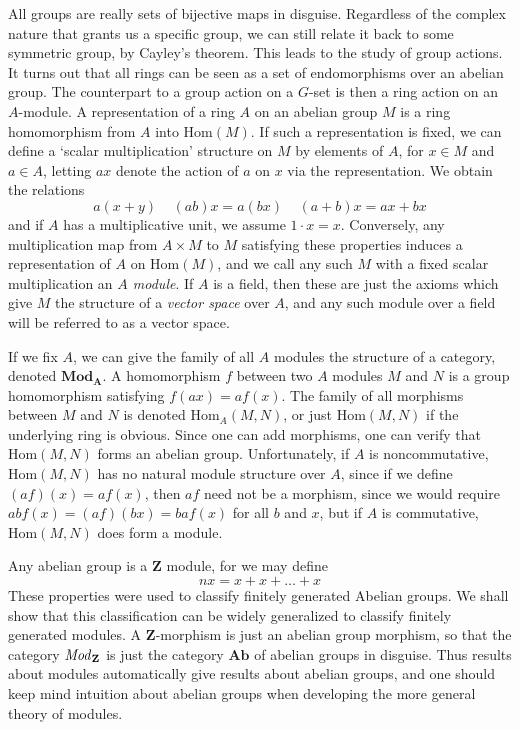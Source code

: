All groups are really sets of bijective maps in disguise. Regardless of the complex nature that grants us a specific group, we can still relate it back to some symmetric group, by Cayley's theorem. This leads to the study of group actions. It turns out that all rings can be seen as a set of endomorphisms over an abelian group. The counterpart to a group action on a $G$-set is then a ring action on an $A$-module. A representation of a ring $A$ on an abelian group $M$ is a ring homomorphism from $A$ into $\text{Hom}(M)$. If such a representation is fixed, we can define a `scalar multiplication' structure on $M$ by elements of $A$, for $x \in M$ and $a \in A$, letting $ax$ denote the action of $a$ on $x$ via the representation. We obtain the relations
%
\[ a(x + y)\ \ \ \ \ (ab) x = a(bx)\ \ \ \ \ (a + b)x = ax + bx \]
%
and if $A$ has a multiplicative unit, we assume $1 \cdot x = x$. Conversely, any multiplication map from $A \times M$ to $M$ satisfying these properties induces a representation of $A$ on $\text{Hom}(M)$, and we call any such $M$ with a fixed scalar multiplication an \emph{$A$ module}. If $A$ is a field, then these are just the axioms which give $M$ the structure of a \emph{vector space} over $A$, and any such module over a field will be referred to as a vector space.

If we fix $A$, we can give the family of all $A$ modules the structure of a category, denoted $\textbf{Mod}_{\textbf{A}}$. A homomorphism $f$ between two $A$ modules $M$ and $N$ is a group homomorphism satisfying $f(ax) = af(x)$. The family of all morphisms between $M$ and $N$ is denoted $\text{Hom}_A(M,N)$, or just $\text{Hom}(M,N)$ if the underlying ring is obvious. Since one can add morphisms, one can verify that $\text{Hom}(M,N)$ forms an abelian group. Unfortunately, if $A$ is noncommutative, $\text{Hom}(M,N)$ has no natural module structure over $A$, since if we define $(af)(x) = af(x)$, then $af$ need not be a morphism, since we would require $ab f(x) = (af)(bx) = ba f(x)$ for all $b$ and $x$, but if $A$ is commutative, $\text{Hom}(M,N)$ does form a module.

\begin{example}
    Any abelian group is a $\mathbf{Z}$ module, for we may define
    \[ nx = x + x + \dots + x \]
    These properties were used to classify finitely generated Abelian groups. We shall show that this classification can be widely generalized to classify finitely generated modules. A $\mathbf{Z}$-morphism is just an abelian group morphism, so that the category $\text{\emph{Mod}}_\mathbf{Z}$ is just the category $\mathbf{Ab}$ of abelian groups in disguise. Thus results about modules automatically give results about abelian groups, and one should keep mind intuition about abelian groups when developing the more general theory of modules.
\end{example}

